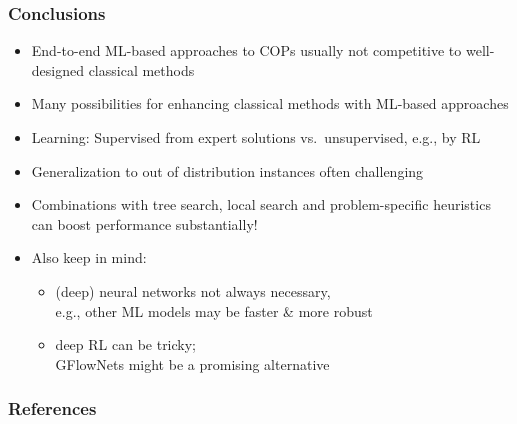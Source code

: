 \documentclass[aspectratio=1610]{beamer}
\renewcommand{\footnotesize}{\scriptsize}
\begin{document}



\begin{frame}
	\frametitle{Conclusions}
	\begin{itemize}
		\itemsep2.5ex
		\item End-to-end ML-based approaches to COPs usually not competitive to well-designed classical methods
		\item Many possibilities for enhancing classical methods with ML-based approaches
		\item Learning: Supervised from expert solutions vs.\ unsupervised, e.g., by RL
		\item Generalization to out of distribution instances often challenging
		\item Combinations with tree search, local search and problem-specific heuristics can boost performance substantially!
		\item Also keep in mind: 
		\begin{itemize}
			\item (deep) neural networks not always necessary,\\
			e.g., other ML models may be faster \& more robust
			\item deep RL can be tricky;\\ GFlowNets might be a promising alternative
		\end{itemize}
	\end{itemize}
\end{frame}


\begin{frame}[allowframebreaks]
	\frametitle{References}
	\footnotesize
	
	
\end{frame}
\end{document}

